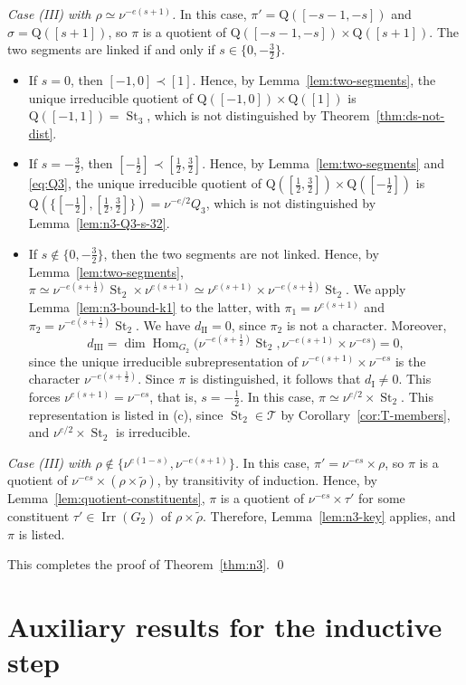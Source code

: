 \documentclass[11pt]{amsart}
\numberwithin{equation}{section}
\theoremstyle{plain}
\theoremstyle{definition}
\theoremstyle{remark}
\newcommand{\T}{\mathcal{T}}
\DeclareMathOperator{\Hom}{Hom}
\DeclareMathOperator{\Irr}{Irr}
\DeclareMathOperator{\St}{St}
\newcommand{\Qq}{\mathrm{Q}}
\newcommand{\dI}{d_{\mathrm{I}}}
\newcommand{\dII}{d_{\mathrm{II}}}
\newcommand{\dIII}{d_{\mathrm{III}}}
\begin{document}
\emph{Case \textup{(III)} with $\rho\simeq\nu^{-e(s+1)}$.} In this case, $\pi'=\Qq([-s-1,-s])$ and $\sigma=\Qq([s+1])$, so $\pi$ is a quotient of $\Qq([-s-1,-s])\times\Qq([s+1])$. The two segments are linked if and only if $s\in\{0,-\frac32\}$.
\begin{itemize}
	\item If $s=0$, then $[-1,0]\prec[1]$. Hence, by Lemma~\ref{lem:two-segments}, the unique irreducible quotient of $\Qq([-1,0])\times\Qq([1])$ is $\Qq([-1,1])=\St_3$, which is not distinguished by Theorem~\ref{thm:ds-not-dist}.
	\item If $s=-\frac32$, then $[-\frac12]\prec[\frac12,\frac32]$. Hence, by Lemma~\ref{lem:two-segments} and \eqref{eq:Q3}, the unique irreducible quotient of $\Qq([\frac12,\frac32])\times\Qq([-\frac12])$ is $\Qq(\{[-\frac12],[\frac12,\frac32]\})=\nu^{-e/2}Q_3$, which is not distinguished by Lemma~\ref{lem:n3-Q3-s-32}.
	\item If $s\notin\{0,-\frac32\}$, then the two segments are not linked. Hence, by Lemma~\ref{lem:two-segments}, $\pi\simeq\nu^{-e(s+\frac12)}\St_2\times\nu^{e(s+1)}\simeq\nu^{e(s+1)}\times\nu^{-e(s+\frac12)}\St_2$. We apply Lemma~\ref{lem:n3-bound-k1} to the latter, with $\pi_1=\nu^{e(s+1)}$ and $\pi_2=\nu^{-e(s+\frac12)}\St_2$. We have $\dII=0$, since $\pi_2$ is not a character. Moreover,
	$$\dIII=\dim\Hom_{G_2}\big(\nu^{-e(s+\frac12)}\St_2,\nu^{-e(s+1)}\times\nu^{-es}\big)=0,
	$$
	since the unique irreducible subrepresentation of $\nu^{-e(s+1)}\times\nu^{-es}$ is the character $\nu^{-e(s+\frac12)}$. Since $\pi$ is distinguished, it follows that $\dI\ne0$. This forces $\nu^{e(s+1)}=\nu^{-es}$, that is, $s=-\frac12$. In this case, $\pi\simeq\nu^{e/2}\times\St_2$. This representation is listed in (c), since $\St_2\in\T$ by Corollary~\ref{cor:T-members}, and $\nu^{e/2}\times\St_2$ is irreducible.
\end{itemize}

\emph{Case \textup{(III)} with $\rho\notin\{\nu^{e(1-s)},\nu^{-e(s+1)}\}$.} In this case, $\pi'=\nu^{-es}\times\rho$, so $\pi$ is a quotient of $\nu^{-es}\times(\rho\times\widetilde\rho)$, by transitivity of induction. Hence, by Lemma~\ref{lem:quotient-constituents}, $\pi$ is a quotient of $\nu^{-es}\times\tau'$ for some constituent $\tau'\in\Irr(G_2)$ of $\rho\times\widetilde\rho$. Therefore, Lemma~\ref{lem:n3-key} applies, and $\pi$ is listed.

This completes the proof of Theorem~\ref{thm:n3}. \qed

\section{Auxiliary results for the inductive step}\label{sec:aux}
\end{document}

